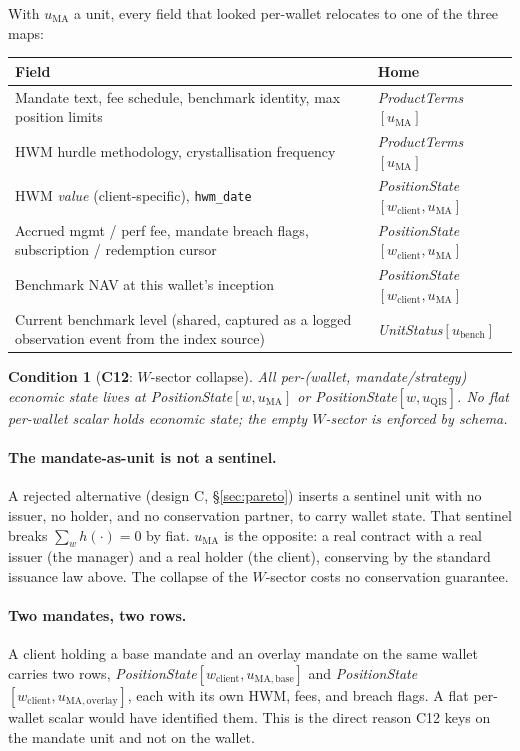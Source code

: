\documentclass[11pt,a4paper]{article}
\newtheorem{condition}[definition]{Condition}
\begin{document}
\noindent With $u_{\mathrm{MA}}$ a unit, every field that looked per-wallet relocates to one
of the three maps:

\begin{longtable}{p{8.6cm}p{6.0cm}}
\toprule
\textbf{Field} & \textbf{Home} \\
\midrule
Mandate text, fee schedule, benchmark identity, max position limits &
\emph{ProductTerms}$[u_{\mathrm{MA}}]$ \\
HWM hurdle methodology, crystallisation frequency &
\emph{ProductTerms}$[u_{\mathrm{MA}}]$ \\
HWM \emph{value} (client-specific), \texttt{hwm\_date} &
\emph{PositionState}$[w_{\mathrm{client}},u_{\mathrm{MA}}]$ \\
Accrued mgmt / perf fee, mandate breach flags, subscription / redemption cursor &
\emph{PositionState}$[w_{\mathrm{client}},u_{\mathrm{MA}}]$ \\
Benchmark NAV at this wallet's inception &
\emph{PositionState}$[w_{\mathrm{client}},u_{\mathrm{MA}}]$ \\
Current benchmark level (shared, captured as a logged observation event from the index source) &
\emph{UnitStatus}$[u_{\mathrm{bench}}]$ \\
\bottomrule
\end{longtable}

\begin{condition}[\textbf{C12}: $W$-sector collapse]
All per-(wallet, mandate/strategy) economic state lives at
\emph{PositionState}$[w,u_{\mathrm{MA}}]$ or \emph{PositionState}$[w,u_{\mathrm{QIS}}]$.
No flat per-wallet scalar holds economic state; the empty $W$-sector is enforced by schema.
\end{condition}

\paragraph{The mandate-as-unit is not a sentinel.}
A rejected alternative (design C, \S\ref{sec:pareto}) inserts a sentinel unit with no
issuer, no holder, and no conservation partner, to carry wallet state. That sentinel breaks
$\sum_w h(\cdot)=0$ by fiat. $u_{\mathrm{MA}}$ is the opposite: a real contract with a real
issuer (the manager) and a real holder (the client), conserving by the standard issuance
law above. The collapse of the $W$-sector costs no conservation guarantee.

\paragraph{Two mandates, two rows.}
A client holding a base mandate and an overlay mandate on the same wallet carries two rows,
\emph{PositionState}$[w_{\mathrm{client}},u_{\mathrm{MA,base}}]$ and
\emph{PositionState}$[w_{\mathrm{client}},u_{\mathrm{MA,overlay}}]$, each with its own HWM,
fees, and breach flags. A flat per-wallet scalar would have identified them. This is the
direct reason C12 keys on the mandate unit and not on the wallet.
\end{document}
